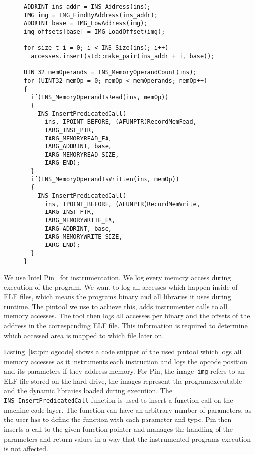 \begin{figure}
\begin{minipage}{\linewidth}
\begin{lstlisting}[style=CStyle,
                   caption={Example C++ code for a pintool logging memory
accesses. The tool stores the locations of instructions and parameters if they
point to memory. The tool stores accesses for reading and writing seperately.},
                   label={lst:pinlogcode}]
ADDRINT ins_addr = INS_Address(ins);
IMG img = IMG_FindByAddress(ins_addr);
ADDRINT base = IMG_LowAddress(img);
img_offsets[base] = IMG_LoadOffset(img);

for(size_t i = 0; i < INS_Size(ins); i++)
  accesses.insert(std::make_pair(ins_addr + i, base));

UINT32 memOperands = INS_MemoryOperandCount(ins);
for (UINT32 memOp = 0; memOp < memOperands; memOp++)
{
  if(INS_MemoryOperandIsRead(ins, memOp))
  {
    INS_InsertPredicatedCall(
      ins, IPOINT_BEFORE, (AFUNPTR)RecordMemRead,
      IARG_INST_PTR,
      IARG_MEMORYREAD_EA,
      IARG_ADDRINT, base,
      IARG_MEMORYREAD_SIZE,
      IARG_END);
  }
  if(INS_MemoryOperandIsWritten(ins, memOp))
  {
    INS_InsertPredicatedCall(
      ins, IPOINT_BEFORE, (AFUNPTR)RecordMemWrite,
      IARG_INST_PTR,
      IARG_MEMORYWRITE_EA,
      IARG_ADDRINT, base,
      IARG_MEMORYWRITE_SIZE,
      IARG_END);
  }
}
\end{lstlisting}
\end{minipage}
\end{figure}

We use Intel Pin~\cite{pintool} for instrumentation. We log every memory access
during execution of the program. We want to log all accesses which happen inside
of ELF files, which means the program\textquotesingle s binary and all libraries
it uses during runtime. The pintool we use to achieve this, adds instrumenter
calls to all memory accesses. The tool then logs all accesses per binary and the
offsets of the address in the corresponding ELF file. This information is
required to determine which accessed area is mapped to which file later on.

Listing~\ref{lst:pinlogcode} shows a code snippet of the used pintool which
logs all memory accesses as it instruments each instruction and logs the opcode
position and its parameters if they address memory. For Pin, the
image~\texttt{img} refers to an ELF file stored on the hard drive, the images
represent the program\textquotesingle executable and the dynamic libraries
loaded during execution. The \texttt{INS\_InsertPredicatedCall} function is used
to insert a function call on the machine code layer. The function can have an
arbitrary number of parameters, as the user has to define the function with each
parameter and type. Pin then inserts a call to the given function pointer and
manages the handling of the parameters and return values in a way that the
instrumented program\textquotesingle s execution is not affected.

